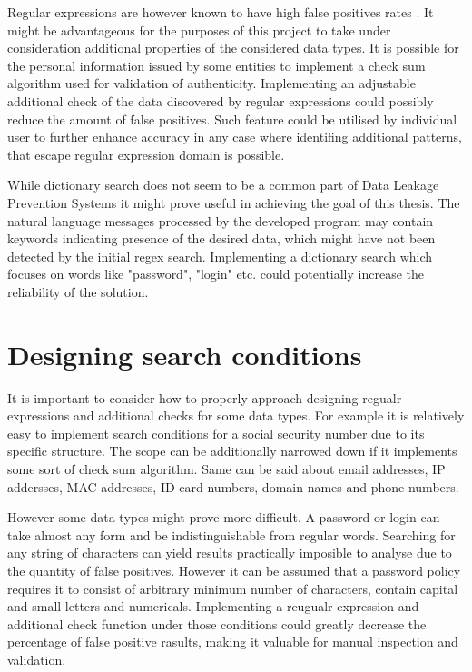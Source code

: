 \documentclass[a4paper,twoside,12pt]{book}
\begin{document}
Regular expressions are however known to have high false positives rates \cite{bib:articleDLPS}. It might be advantageous for the purposes of this project 
to take under consideration additional properties of the considered data types. It is possible for the personal information issued
by some entities to implement a check sum algorithm used for validation of authenticity. Implementing an adjustable additional check 
of the data discovered by regular expressions could possibly reduce the amount of false positives. Such feature could be utilised by 
individual user to further enhance accuracy in any case where identifing additional patterns, that escape regular expression domain is possible.

While dictionary search does not seem to be a common part of Data Leakage Prevention Systems it might prove useful in achieving the goal of this thesis.
The natural language messages processed by the developed program may contain keywords indicating presence of the desired data, which might have not been 
detected by the initial regex search. Implementing a dictionary search which focuses on words like "password", "login" etc. could potentially increase the
reliability of the solution. 

\section{Designing search conditions}

It is important to consider how to properly approach designing regualr expressions and additional checks for some data types. 
For example it is relatively easy to implement search conditions for a social security number due to its specific structure.
The scope can be additionally narrowed down if it implements some sort of check sum algorithm. Same can be said about 
email addresses, IP addersses, MAC addresses, ID card numbers, domain names and phone numbers.

However some data types might prove more difficult. A password or login can take almost any form and be indistinguishable from regular words.
Searching for any string of characters can yield results practically imposible to analyse due to the quantity of false positives. 
However it can be assumed that a password policy requires it to consist of arbitrary minimum number of characters, contain 
capital and small letters and numericals. Implementing a reugualr expression and additional check function under those conditions
could greatly decrease the percentage of false positive rasults, making it valuable for manual inspection and validation.
\end{document}
